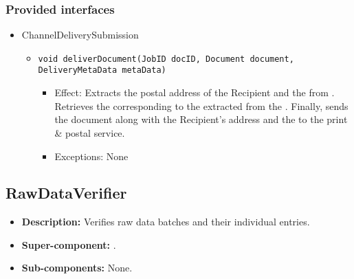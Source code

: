 \subsubsection*{Provided interfaces}
\begin{itemize}
    \item ChannelDeliverySubmission
    \begin{itemize}
        \item \texttt{void deliverDocument(JobID docID, Document document, DeliveryMetaData metaData)}
        \begin{itemize}
            \item Effect: Extracts the postal address of the Recipient and the  from . Retrieves the  corresponding to the extracted  from the . Finally, sends the document along with the Recipient's address and the  to the print \& postal service.
            \item Exceptions: None
        \end{itemize}
    \end{itemize}
\end{itemize}

\subsection{RawDataVerifier}\label{sec:rawdataverifier}
\begin{itemize}
	\item \textbf{Description:} Verifies raw data batches and their individual entries.
	\item \textbf{Super-component:} .
	\item \textbf{Sub-components:} None.
\end{itemize}

